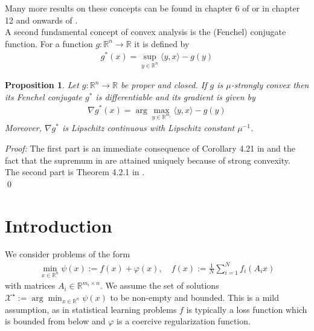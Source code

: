\documentclass[12pt,a4paper,twoside]{article}
\makeatletter
\renewcommand*{\eqref}[1]{%
	\hyperref[{#1}]{\textup{\tagform@{\ref*{#1}}}}%
}
\theoremstyle{plain}
\newtheorem{prop}[thm]{Proposition}
\theoremstyle{note}
\numberwithin{thm}{section}
\newcommand{\oneover}[1]{\frac{1}{#1}}
\let\temp\phi
\let\phi\varphi
\let\varphi\temp
\makeatother
\begin{document}
	Many more results on these concepts can be found in chapter 6 of \cite{Beck2017} or in chapter 12 and onwards of \cite{Bauschke2011}.\\
	
	\vspace{5mm}
	A second fundamental concept of convex analysis is the (Fenchel) conjugate function. For a function $g: \mathbb{R}^n \to \mathbb{R}$ it is defined by
	\begin{align}
	\label{def:convex_conjugate}
	g^\ast(x) = \sup_{y\in \mathbb{R}^{n}} \langle y,x\rangle -g(y)
	\end{align} 	
	\medskip
	\begin{prop}
		\label{prop:strongly_convex_lipschitz}
		Let $g: \mathbb{R}^n \to \mathbb{R}$ be proper and closed. If $g$ is $\mu$-strongly convex then its Fenchel conjugate $g^\ast$ is differentiable and its gradient is given by
		\begin{align*}
		\nabla g^\ast(x) = \arg \max_{y\in \mathbb{R}^{m_i}} \langle y,x\rangle -g(y)
		\end{align*}
		Moreover, $\nabla g^\ast$ is Lipschitz continuous with Lipschitz constant $\mu^{-1}$.
	\end{prop}
	\textit{Proof:} The first part is an immediate consequence of Corollary 4.21 in \cite{Beck2017} and the fact that the supremum in \eqref{def:convex_conjugate} are attained uniquely because of strong convexity.\\
	The second part is Theorem 4.2.1 in \cite{HiriartUrruty1993}.\\
	\qed
	\medskip
	
	\section{Introduction}
	We consider problems of the form 
	\begin{align}
	\label{prob:deterministic}
		\min_{x \in \mathbb{R}^n} \psi(x):= f(x) + \phi(x), \quad f(x) := \oneover{N}\sum_{i=1}^{N} f_i(A_ix)
	\end{align}
	with matrices $A_i \in \mathbb{R}^{m_i \times n}$. We assume the set of solutions $\mathcal{X}^\star := \arg \min_{x \in \mathbb{R}^n} \psi(x)$ to be non-empty and bounded. This is a mild assumption, as in statistical learning problems $f$ is typically a loss function which is bounded from below and $\phi$ is a coercive regularization function.
	
\end{document}
